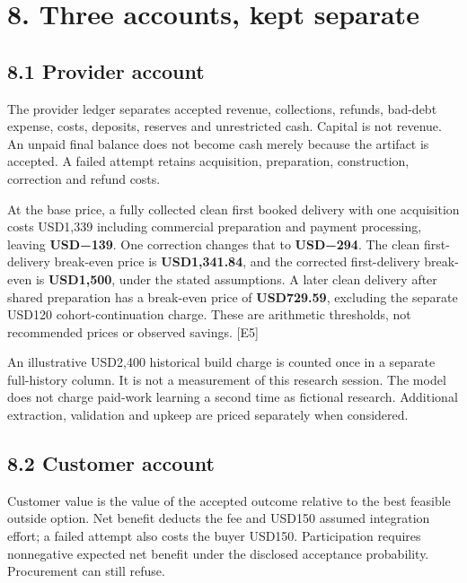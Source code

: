 \documentclass[11pt,letterpaper]{article}
\begin{document}
\hypertarget{three-accounts-kept-separate}{%
\section{8. Three accounts, kept separate}\label{three-accounts-kept-separate}}

\hypertarget{provider-account}{%
\subsection{8.1 Provider account}\label{provider-account}}

The provider ledger separates accepted revenue, collections, refunds, bad-debt expense, costs, deposits, reserves and unrestricted cash. Capital is not revenue. An unpaid final balance does not become cash merely because the artifact is accepted. A failed attempt retains acquisition, preparation, construction, correction and refund costs.

At the base price, a fully collected clean first booked delivery with one acquisition costs USD1,339 including commercial preparation and payment processing, leaving \textbf{USD−139}. One correction changes that to \textbf{USD−294}. The clean first-delivery break-even price is \textbf{USD1,341.84}, and the corrected first-delivery break-even is \textbf{USD1,500}, under the stated assumptions. A later clean delivery after shared preparation has a break-even price of \textbf{USD729.59}, excluding the separate USD120 cohort-continuation charge. These are arithmetic thresholds, not recommended prices or observed savings. {[}E5{]}

An illustrative USD2,400 historical build charge is counted once in a separate full-history column. It is not a measurement of this research session. The model does not charge paid-work learning a second time as fictional research. Additional extraction, validation and upkeep are priced separately when considered.

\hypertarget{customer-account}{%
\subsection{8.2 Customer account}\label{customer-account}}

Customer value is the value of the accepted outcome relative to the best feasible outside option. Net benefit deducts the fee and USD150 assumed integration effort; a failed attempt also costs the buyer USD150. Participation requires nonnegative expected net benefit under the disclosed acceptance probability. Procurement can still refuse.
\end{document}
